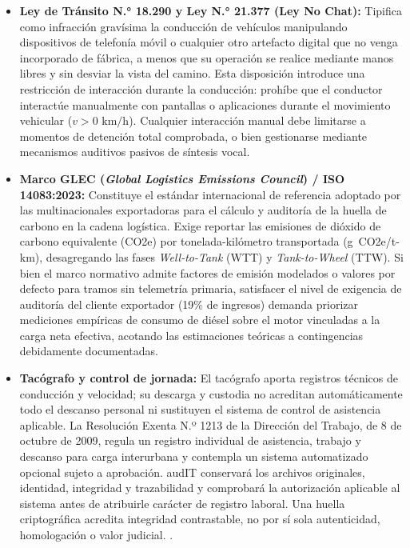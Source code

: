\begin{itemize}
\begin{itemize}
  \end{itemize}
  \item \textbf{Ley de Tránsito N.° 18.290 y Ley N.° 21.377 (Ley No Chat):} Tipifica como infracción gravísima la conducción de vehículos manipulando dispositivos de telefonía móvil o cualquier otro artefacto digital que no venga incorporado de fábrica, a menos que su operación se realice mediante manos libres y sin desviar la vista del camino. Esta disposición introduce una restricción de interacción durante la conducción: prohíbe que el conductor interactúe manualmente con pantallas o aplicaciones durante el movimiento vehicular ($v > 0\text{ km/h}$). Cualquier interacción manual debe limitarse a momentos de detención total comprobada, o bien gestionarse mediante mecanismos auditivos pasivos de síntesis vocal.
  \item \textbf{Marco GLEC (\textit{Global Logistics Emissions Council}) / ISO 14083:2023:} Constituye el estándar internacional de referencia adoptado por las multinacionales exportadoras para el cálculo y auditoría de la huella de carbono en la cadena logística. Exige reportar las emisiones de dióxido de carbono equivalente (CO2e) por tonelada-kilómetro transportada (g~CO2e/t-km), desagregando las fases \textit{Well-to-Tank} (WTT) y \textit{Tank-to-Wheel} (TTW). Si bien el marco normativo admite factores de emisión modelados o valores por defecto para tramos sin telemetría primaria, satisfacer el nivel de exigencia de auditoría del cliente exportador (19\% de ingresos) demanda priorizar mediciones empíricas de consumo de diésel sobre el motor vinculadas a la carga neta efectiva, acotando las estimaciones teóricas a contingencias debidamente documentadas.
  \item \textbf{Tacógrafo y control de jornada:} El tacógrafo aporta registros técnicos de conducción y velocidad; su descarga y custodia no acreditan automáticamente todo el descanso personal ni sustituyen el sistema de control de asistencia aplicable. La Resolución Exenta N.º 1213 de la Dirección del Trabajo, de 8 de octubre de 2009, regula un registro individual de asistencia, trabajo y descanso para carga interurbana y contempla un sistema automatizado opcional sujeto a aprobación. audIT conservará los archivos originales, identidad, integridad y trazabilidad y comprobará la autorización aplicable al sistema antes de atribuirle carácter de registro laboral. Una huella criptográfica acredita integridad contrastable, no por sí sola autenticidad, homologación o valor judicial. \parencite{dt1213_2009}.
\end{itemize}

